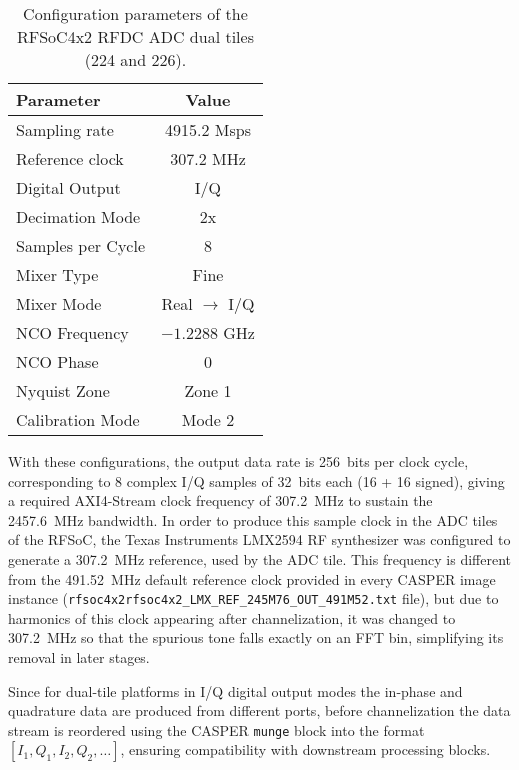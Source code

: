 \begin{table}[h!]
\centering
\begin{tabular}{lc}
\toprule
Parameter & Value \\
\midrule
Sampling rate & 4915.2 Msps \\
Reference clock & 307.2 MHz \\
Digital Output & I/Q \\
Decimation Mode & 2x \\
Samples per Cycle & 8 \\
Mixer Type & Fine \\
Mixer Mode & Real $\rightarrow$ I/Q \\
NCO Frequency & $-1.2288$ GHz \\
NCO Phase & 0 \\
Nyquist Zone & Zone 1 \\
Calibration Mode & Mode 2 \\
\bottomrule
\end{tabular}
\caption{Configuration parameters of the RFSoC4x2 RFDC ADC dual tiles (224 and 226).}
\label{tab:rfdc_config}
\end{table}


With these configurations, the output data rate is \SI{256}{bits} per clock cycle, corresponding to 8 complex I/Q samples of \SI{32}{bits} each (16 + 16 signed), giving a required AXI4-Stream clock frequency of \SI{307.2}{\mega\hertz} to sustain the \SI{2457.6}{\mega\hertz} bandwidth. In order to produce this sample clock in the ADC tiles of the RFSoC, the Texas Instruments LMX2594 RF synthesizer was configured to generate a \SI{307.2}{\mega\hertz} reference, used by the ADC tile. This frequency is different from the \SI{491.52}{\mega\hertz} default reference clock provided in every CASPER image instance (\texttt{rfsoc4x2rfsoc4x2\_LMX\_REF\_245M76\_OUT\_491M52.txt} file), but due to harmonics of this clock appearing after channelization, it was changed to \SI{307.2}{\mega\hertz} so that the spurious tone falls exactly on an FFT bin, simplifying its removal in later stages.

Since for dual-tile platforms in I/Q digital output modes the in-phase and quadrature data are produced from different ports, before channelization the data stream is reordered using the CASPER \texttt{munge} block into the format $[I_1, Q_1, I_2, Q_2, \dots]$, ensuring compatibility with downstream processing blocks.

